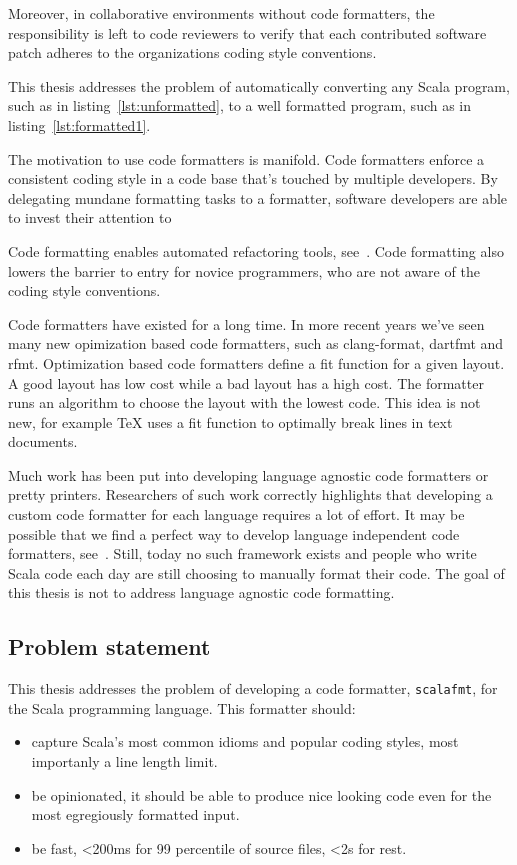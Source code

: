 \documentclass[11pt,a4paper]{article}
\newcommand{\scalafmt}{\texttt{scalafmt}}
\begin{document}
Moreover, in collaborative environments without code formatters,
the responsibility is left to code reviewers to verify that each contributed software patch adheres to the organizations coding style conventions.



This thesis addresses the problem of automatically converting any Scala program, such as in listing~\ref{lst:unformatted}, to a well formatted program, such as in listing~\ref{lst:formatted1}.

The motivation to use code formatters is manifold.
Code formatters enforce a consistent coding style in a code base that's touched by multiple developers.
By delegating mundane formatting tasks to a formatter, software developers are able to invest their attention to 

Code formatting enables automated refactoring tools, see~\autocite{wright_large-scale_2013}.
Code formatting also lowers the barrier to entry for novice programmers, who are not aware of the coding style conventions.

Code formatters have existed for a long time.
In more recent years we've seen many new opimization based code formatters, such as clang-format, dartfmt and rfmt.
Optimization based code formatters define a fit function for a given layout.
A good layout has low cost while a bad layout has a high cost.
The formatter runs an algorithm to choose the layout with the lowest code.
This idea is not new, for example TeX uses a fit function to optimally break lines
in text documents.

Much work has been put into developing language agnostic code formatters or pretty printers.
Researchers of such work correctly highlights that developing a custom code formatter for each language requires a lot of effort.
It may be possible that we find a perfect way to develop language independent code formatters, see~\autocite{mps_article}.
Still, today no such framework exists and people who write Scala code each day are still choosing to manually format their code.
The goal of this thesis is not to address language agnostic code formatting.

\subsection{Problem statement}
This thesis addresses the problem of developing a code formatter, \scalafmt, for the Scala programming language.
This formatter should:
\begin{itemize}
  \item capture Scala's most common idioms and popular coding styles, most importanly a line length limit.
  \item be opinionated, it should be able to produce nice looking code even for the most egregiously formatted input.
  \item be fast, <200ms for 99 percentile of source files, <2s for rest.
\end{itemize}
\end{document}

